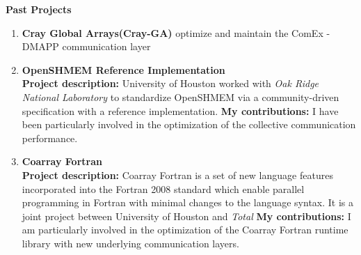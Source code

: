 \textbf{Past Projects}
\begin{enumerate}
\setcounter{enumi}{0}
\item \textbf{Cray Global Arrays(Cray-GA)}
      optimize and maintain the ComEx - DMAPP communication layer

\item \textbf{OpenSHMEM Reference Implementation}\\
      \textbf{Project description:} University of Houston worked with \textit{Oak
      Ridge National Laboratory} to standardize OpenSHMEM via a community-driven
      specification with a reference implementation. \textbf{My contributions:}
      I have been particularly involved in the optimization of the collective
      communication performance.

\item \textbf{Coarray Fortran}\\
     \textbf{Project description:} Coarray Fortran is a set of new language
     features incorporated into the Fortran 2008 standard which enable parallel
     programming in Fortran with minimal changes to the language syntax. It is a
     joint project between University of Houston and \textit{Total}
     \textbf{My contributions:} I am particularly involved in the optimization
     of the Coarray Fortran runtime library with new underlying communication
     layers.
\end{enumerate}
